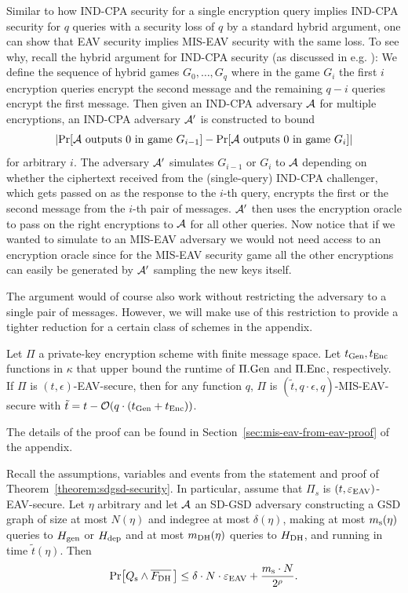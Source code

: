 Similar to how IND-CPA security for a single encryption query implies IND-CPA security for $q$ queries with a security loss of $q$ by a standard hybrid argument, one can show that EAV security implies MIS-EAV security with the same loss. To see why, recall the hybrid argument for IND-CPA security (as discussed in e.g. \cite[Theorem 12.6]{introduction-to-modern-cryptography}): We define the sequence of hybrid games $G_0, \ldots, G_q$ where in the game $G_i$ the first $i$ encryption queries encrypt the second message and the remaining $q - i$ queries encrypt the first message. Then given an IND-CPA adversary $\mathcal{A}$ for multiple encryptions, an IND-CPA adversary $\mathcal{A}'$ is constructed to bound
\[
	\abs*{\pr{\adv \text{ outputs } 0 \text{ in game } G_{i - 1}} - \pr{\adv \text{ outputs } 0 \text{ in game } G_{i}}}
\]
for arbitrary $i$.
The adversary $\mathcal{A}'$ simulates $G_{i - 1}$ or $G_{i}$ to $\mathcal{A}$ depending on whether the ciphertext received from the (single-query) IND-CPA challenger, which gets passed on as the response to the $i$-th query, encrypts the first or the second message from the $i$-th pair of messages. $\mathcal{A}'$ then uses the encryption oracle to pass on the right encryptions to $\mathcal{A}$ for all other queries. Now notice that if we wanted to simulate to an MIS-EAV adversary we would not need access to an encryption oracle since for the MIS-EAV security game all the other encryptions can easily be generated by $\mathcal{A}'$ sampling the new keys itself.

The argument would of course also work without restricting the adversary to a single pair of messages. However, we will make use of this restriction to provide a tighter reduction for a certain class of schemes in the appendix.

\begin{lemma} \label{lemma:mis-eav-from-eav}
	Let $\Pi$ a private-key encryption scheme with finite message space. Let $t_{\mathrm{Gen}}, t_{\mathrm{Enc}}$ functions in $\kappa$ that upper bound the runtime of $\Pi.\mathrm{Gen}$ and $\Pi.\mathrm{Enc}$, respectively. If $\Pi$ is $(t, \epsilon)$-EAV-secure, then for any function $q$, $\Pi$ is $(\tilde{t}, q \cdot \epsilon, q)$-MIS-EAV-secure with $\tilde{t} = t - \mathcal{O}(q \cdot (t_{\mathrm{Gen}} + t_{\mathrm{Enc}}))$.
\end{lemma}

The details of the proof can be found in Section~\ref{sec:mis-eav-from-eav-proof} of the appendix.

\begin{lemma} \label{lemma:eav-reduction}
	Recall the assumptions, variables and events from the statement and proof of Theorem~\ref{theorem:sdgsd-security}. In particular, assume that $\Pi_s$ is $(t, \varepsilon_\mathrm{EAV})$-EAV-secure. Let $\eta$ arbitrary and let $\mathcal{A}$ an SD-GSD adversary constructing a GSD graph of size at most $N(\eta)$ and indegree at most $\delta(\eta)$, making at most $m_\mathrm{s}(\eta)$ queries to $H_\mathrm{gen}$ or $H_\mathrm{dep}$ and at most $m_\mathrm{DH}(\eta)$ queries to $H_\mathrm{DH}$, and running in time $\tilde{t}(\eta)$. Then
	\[
		\pr{\qs \land \overline{\fdh}\,} \le \delta \cdot N \cdot \eeav + \frac{\ms \cdot N}{2^\rho}.
	\]
\end{lemma}

